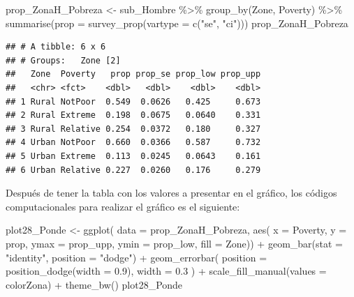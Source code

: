 \documentclass[
  12pt,
]{book}
\newenvironment{Shaded}{\begin{snugshade}}{\end{snugshade}}
\newcommand{\AttributeTok}[1]{\textcolor[rgb]{0.77,0.63,0.00}{#1}}
\newcommand{\FloatTok}[1]{\textcolor[rgb]{0.00,0.00,0.81}{#1}}
\newcommand{\FunctionTok}[1]{\textcolor[rgb]{0.00,0.00,0.00}{#1}}
\newcommand{\NormalTok}[1]{#1}
\newcommand{\OtherTok}[1]{\textcolor[rgb]{0.56,0.35,0.01}{#1}}
\newcommand{\SpecialCharTok}[1]{\textcolor[rgb]{0.00,0.00,0.00}{#1}}
\newcommand{\StringTok}[1]{\textcolor[rgb]{0.31,0.60,0.02}{#1}}
\begin{document}
\begin{Shaded}
\begin{Highlighting}[]
\NormalTok{prop\_ZonaH\_Pobreza }\OtherTok{\textless{}{-}}\NormalTok{ sub\_Hombre }\SpecialCharTok{\%\textgreater{}\%}
  \FunctionTok{group\_by}\NormalTok{(Zone, Poverty) }\SpecialCharTok{\%\textgreater{}\%}
  \FunctionTok{summarise}\NormalTok{(}\AttributeTok{prop =} \FunctionTok{survey\_prop}\NormalTok{(}\AttributeTok{vartype =} \FunctionTok{c}\NormalTok{(}\StringTok{"se"}\NormalTok{, }\StringTok{"ci"}\NormalTok{)))}
\NormalTok{prop\_ZonaH\_Pobreza}
\end{Highlighting}
\end{Shaded}

\begin{verbatim}
## # A tibble: 6 x 6
## # Groups:   Zone [2]
##   Zone  Poverty   prop prop_se prop_low prop_upp
##   <chr> <fct>    <dbl>   <dbl>    <dbl>    <dbl>
## 1 Rural NotPoor  0.549  0.0626   0.425     0.673
## 2 Rural Extreme  0.198  0.0675   0.0640    0.331
## 3 Rural Relative 0.254  0.0372   0.180     0.327
## 4 Urban NotPoor  0.660  0.0366   0.587     0.732
## 5 Urban Extreme  0.113  0.0245   0.0643    0.161
## 6 Urban Relative 0.227  0.0260   0.176     0.279
\end{verbatim}

Después de tener la tabla con los valores a presentar en el gráfico, los códigos computacionales para realizar el gráfico es el siguiente:

\begin{Shaded}
\begin{Highlighting}[]
\NormalTok{plot28\_Ponde }\OtherTok{\textless{}{-}} \FunctionTok{ggplot}\NormalTok{(}
  \AttributeTok{data =}\NormalTok{ prop\_ZonaH\_Pobreza,}
  \FunctionTok{aes}\NormalTok{(}
    \AttributeTok{x =}\NormalTok{ Poverty, }\AttributeTok{y =}\NormalTok{ prop,}
    \AttributeTok{ymax =}\NormalTok{ prop\_upp, }\AttributeTok{ymin =}\NormalTok{ prop\_low,}
    \AttributeTok{fill =}\NormalTok{ Zone)) }\SpecialCharTok{+} 
  \FunctionTok{geom\_bar}\NormalTok{(}\AttributeTok{stat =} \StringTok{"identity"}\NormalTok{, }\AttributeTok{position =} \StringTok{"dodge"}\NormalTok{) }\SpecialCharTok{+}
  \FunctionTok{geom\_errorbar}\NormalTok{(}
    \AttributeTok{position =} \FunctionTok{position\_dodge}\NormalTok{(}\AttributeTok{width =} \FloatTok{0.9}\NormalTok{),}
    \AttributeTok{width =} \FloatTok{0.3}
\NormalTok{  ) }\SpecialCharTok{+} \FunctionTok{scale\_fill\_manual}\NormalTok{(}\AttributeTok{values =}\NormalTok{ colorZona) }\SpecialCharTok{+}
  \FunctionTok{theme\_bw}\NormalTok{()}
\NormalTok{plot28\_Ponde}
\end{Highlighting}
\end{Shaded}
\end{document}
